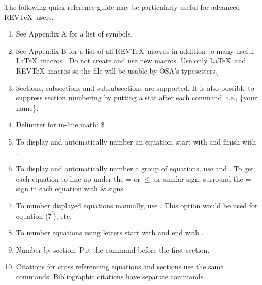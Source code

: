      The following quick-reference guide may be particularly
useful for advanced REV\TeX\ users.         \\
\begin{enumerate}
 \item   See Appendix A for a list of symbols.
 \item    See Appendix B for a list of all REV\TeX\ macros in
          addition to many useful \LaTeX\ macros.  [Do not create
          and use new macros.  Use only \LaTeX\ and REV\TeX\ macros
          so the file will be usable by OSA's typesetters.]
 \item  Sections, subsections and subsubsections are supported.  It
 is also possible to suppress section numbering by putting a star
 after each command, i.e., \{your name\}.
   \vspace{-.15in}
 \item    Delimiter for in-line math:  \$
 \item    To display and automatically number an equation, start
          with 
          and finish with .
 \item    To display and automatically number a group of
          equations, use   and
          .  To
          get each equation to line up under the = or $\leq $ or
          similar sign, surround the = sign in each equation with
          \& signs.
 \item    To number displayed equations manually, use
           .  This option would be used for
          equation ($7^{\prime} $), etc.
 \item    To number equations using letters start with
    and end with  .
 \item    Number by section:  Put the  command before
          the first section.
 \item  Citations for cross referencing equations and sections use
 the same commands.  Bibliographic citations have separate commands.\\
 \begin{tabbing}

\end{tabbing}
\end{enumerate}
